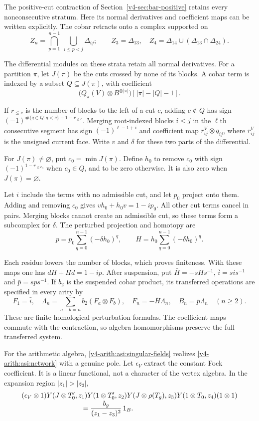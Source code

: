 The positive-cut contraction of
Section~\ref{v4-sec:bar-positive} retains every nonconsecutive stratum.
Here its normal derivatives and coefficient maps can be written
explicitly. The cobar retracts onto a complex supported on
\[
 Z_n=\bigcap_{p=1}^{n-1}\ \bigcup_{i\le p<j}\Delta_{ij};
 \qquad Z_3=\Delta_{13},\quad
 Z_4=\Delta_{14}\cup(\Delta_{13}\cap\Delta_{24}).
\]

The differential modules on these strata retain all normal derivatives.
For a partition $\pi$, let
$J(\pi)$ be the cuts crossed by none of its blocks. A cobar term is indexed
by a subset $Q\subseteq J(\pi)$, with coefficient
\[
 \bigl(Q_\pi(V)\otimes B^{\otimes|\pi|}\bigr)
             [|\pi|-|Q|-1].
\]

If $r_{\le c}$ is the number of blocks to the left of a cut $c$, adding
$c\notin Q$ has sign
$(-1)^{\#\{q\in Q:q<c\}+1-r_{\le c}}$.
Merging root-indexed blocks $i<j$ in the $\ell$th consecutive segment
has sign $(-1)^{\ell-1+i}$ and coefficient map
$r^V_{ij}\otimes q_{ij}$, where $r^V_{ij}$ is the unsigned current face.
Write $v$ and $\delta$ for these two parts of the differential.

For $J(\pi)\ne\varnothing$, put $c_0=\min J(\pi)$. Define $h_0$ to remove
$c_0$ with sign $(-1)^{1-r_{\le c_0}}$ when $c_0\in Q$, and to be zero
otherwise. It is also zero when $J(\pi)=\varnothing$.

Let $i$ include the terms with no admissible cut, and let $p_0$ project
onto them. Adding and removing $c_0$ gives $vh_0+h_0v=1-ip_0$.
All other cut terms cancel in pairs.
Merging blocks cannot create an admissible cut, so these terms form a
subcomplex for $\delta$. The perturbed projection and homotopy are
\[
 p=p_0\sum_{q=0}^{n-1}(-\delta h_0)^q,\qquad
 H=h_0\sum_{q=0}^{n-1}(-\delta h_0)^q.
\]

Each residue lowers the number of blocks, which proves finiteness. With
these maps one has $dH+Hd=1-ip$.
After suspension, put $\bar H=-sHs^{-1}$, $\bar i=sis^{-1}$ and
$\bar p=sps^{-1}$. If $b_2$ is the suspended cobar product, its transferred
operations are specified in every arity by
\[
 F_1=\bar i,\quad
 \Lambda_n=\sum_{a+b=n}b_2(F_a\otimes F_b),\quad
 F_n=-\bar H\Lambda_n,\quad B_n=\bar p\Lambda_n\quad(n\ge2).
\]
These are finite homological perturbation formulas. The coefficient maps
commute with the contraction, so algebra homomorphisms preserve the full
transferred system.

For the arithmetic algebra, \eqref{v4-arith:asi:singular-fields} realizes
\eqref{v4-arith:asi:network} with a genuine pole. Let $\epsilon_V$ extract the
constant Fock coefficient. It is a linear functional, not a character of
the vertex algebra. In the expansion region $|z_1|>|z_3|$,
\begin{align}
 &(\epsilon_V\otimes1)
 Y(J\otimes T'_0,z_1)Y(1\otimes T'_0,z_2)
 Y(J\otimes\rho(T_g),z_3)Y(1\otimes T_0,z_4)(1\otimes1)
 \notag\\[-1mm]
 &\hspace{30mm}=\frac{b_g}{(z_1-z_3)^2}\,1_B.
 \label{v4-arith:asi:singular-network}
\end{align}

